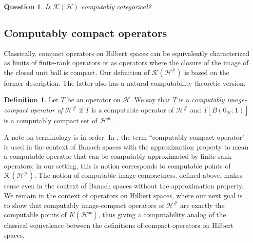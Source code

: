 \documentclass{amsart}
\theoremstyle{plain}
\newtheorem{question}[theorem]{Question}
\theoremstyle{definition}
\newtheorem{definition}[theorem]{Definition}
\numberwithin{equation}{section}
\begin{document}
\begin{question}
Is $\mathcal{K}(\mathcal{H})$ computably categorical?    
\end{question}

\subsection{Computably compact operators}
Classically, compact operators on Hilbert spaces can be equivalently characterized as limits of finite-rank operators or as operators where the closure of the image of the closed unit ball is compact.  Our definition of $\mathcal{K}(\mathcal{H}^\#)$ is based on the former description.  The latter also has a natural computability-theoretic version.

\begin{definition}
Let $T$ be an operator on $\mathcal{H}$.  We say that $T$ is a \emph{computably image-compact operator of $\mathcal{H}^\#$} if $T$ is a computable operator of $\mathcal{H}^\#$ and $\overline{T[\overline{B}(0_\mathcal{H}; 1)]}$ is a computably compact set of $\mathcal{H}^\#$.
\end{definition}

A note on terminology is in order.  In \cite{BrattkaDillhage.2007}, the term ``computably compact operator" is used in the context of Banach spaces with the approximation property to mean a computable operator that can be computably approximated by finite-rank operators; in our setting, this is notion corresponds to computable points of $\mathcal{K}(\mathcal{H}^\#)$.  The notion of computable image-compactness, defined above, makes sense even in the context of Banach spaces without the approximation property.  We remain in the context of operators on Hilbert spaces, where our next goal is to show that computably image-compact operators of $\mathcal{H}^\#$ are exactly the computable points of $K(\mathcal{H}^\#)$, thus giving a computability analog of the classical equivalence between the definitions of compact operators on Hilbert spaces.
\end{document}

